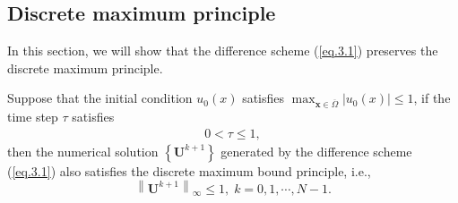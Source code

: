 \documentclass{siamart171218}
\numberwithin{theorem}{section}
\numberwithin{equation}{section}
\begin{document}
\subsection{Discrete maximum principle}
In this section, we will show that the difference scheme
(\ref{eq.3.1}) preserves the
discrete maximum principle.

\begin{theorem}\label{Th.3.12}
Suppose that the initial condition $u_0(x)$ satisfies
$\max_{\mathbf{x}\in\overline{\Omega}}\left|u_0(x)\right| \leq1$, if
the time step $\tau$ satisfies
\begin{equation}\label{eq.3.14}
\begin{aligned}\displaystyle
0<\tau\leq1,
\end{aligned}
\end{equation}
then the numerical
solution $\left\{\mathbf{U}^{k+1}\right\}$ generated by
the difference scheme (\ref{eq.3.1}) also satisfies the discrete
maximum bound principle, i.e.,
$$\left\|\mathbf{U}^{k+1}\right\|_\infty\leq1,\;k=0,1,\cdots,N-1.$$
\end{theorem}
\end{document}
